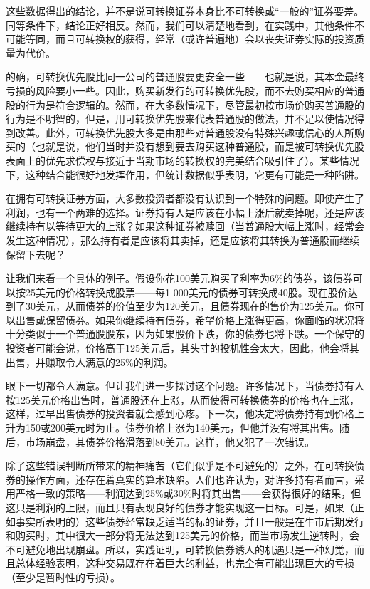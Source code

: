 \documentclass[12pt,oneside]{book}
\begin{document}
这些数据得出的结论，并不是说可转换证券本身比不可转换或“一般的”证券要差。同等条件下，结论正好相反。然而，我们可以清楚地看到，在实践中，其他条件不可能等同，而且可转换权的获得，经常（或许普遍地）会以丧失证券实际的投资质量为代价。

的确，可转换优先股比同一公司的普通股要更安全一些——也就是说，其本金最终亏损的风险要小一些。因此，购买新发行的可转换优先股，而不去购买相应的普通股的行为是符合逻辑的。然而，在大多数情况下，尽管最初按市场价购买普通股的行为是不明智的，但是，用可转换优先股来代表普通股的做法，并不足以使情况得到改善。此外，可转换优先股大多是由那些对普通股没有特殊兴趣或信心的人所购买的（也就是说，他们当时并没有想到要去购买这种普通股，而是被可转换优先股表面上的优先求偿权与接近于当期市场的转换权的完美结合吸引住了）。某些情况下，这种结合能很好地发挥作用，但统计数据似乎表明，它更有可能是一种陷阱。

在拥有可转换证券方面，大多数投资者都没有认识到一个特殊的问题。即使产生了利润，也有一个两难的选择。证券持有人是应该在小幅上涨后就卖掉呢，还是应该继续持有以等待更大的上涨？如果这种证券被赎回（当普通股大幅上涨时，经常会发生这种情况），那么持有者是应该将其卖掉，还是应该将其转换为普通股而继续保留下去呢？

让我们来看一个具体的例子。假设你花100美元购买了利率为6\%的债券，该债券可以按25美元的价格转换成股票——每1 000美元的债券可转换成40股。现在股价达到了30美元，从而债券的价值至少为120美元，且债券现在的售价为125美元。你可以出售或保留债券。如果你继续持有债券，希望价格上涨得更高，你面临的状况将十分类似于一个普通股股东，因为如果股价下跌，你的债券也将下跌。一个保守的投资者可能会说，价格高于125美元后，其头寸的投机性会太大，因此，他会将其出售，并赚取令人满意的25\%的利润。

眼下一切都令人满意。但让我们进一步探讨这个问题。许多情况下，当债券持有人按125美元价格出售时，普通股还在上涨，从而使得可转换债券的价格也在上涨，这样，过早出售债券的投资者就会感到心疼。下一次，他决定将债券持有到价格上升为150或200美元时为止。债券价格上涨为140美元，但他并没有将其出售。随后，市场崩盘，其债券价格滑落到80美元。这样，他又犯了一次错误。

除了这些错误判断所带来的精神痛苦（它们似乎是不可避免的）之外，在可转换债券的操作方面，还存在着真实的算术缺陷。人们也许认为，对许多持有者而言，采用严格一致的策略——利润达到25\%或30\%时将其出售——会获得很好的结果，但这只是利润的上限，而且只有表现良好的债券才能实现这一目标。可是，如果（正如事实所表明的）这些债券经常缺乏适当的标的证券，并且一般是在牛市后期发行和购买时，其中很大一部分将无法达到125美元的价格，而当市场发生逆转时，会不可避免地出现崩盘。所以，实践证明，可转换债券诱人的机遇只是一种幻觉，而且总体经验表明，这种交易既存在着巨大的利益，也完全有可能出现巨大的亏损（至少是暂时性的亏损）。
\end{document}
